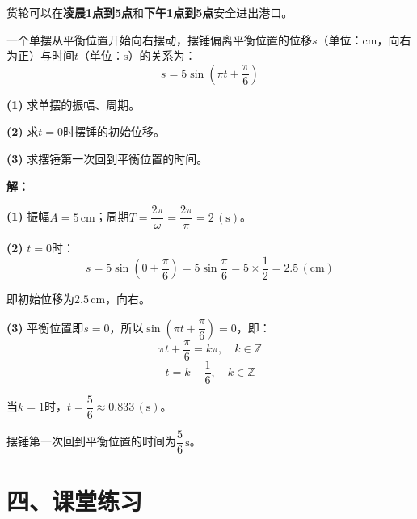 \documentclass[12pt, a4paper]{ctexart}
\begin{document}
货轮可以在\textbf{凌晨1点到5点}和\textbf{下午1点到5点}安全进出港口。

\begin{appbox}[【应用3】单摆与三角函数]
一个单摆从平衡位置开始向右摆动，摆锤偏离平衡位置的位移$s$（单位：$\text{cm}$，向右为正）与时间$t$（单位：$\text{s}$）的关系为：
\[
  s=5\sin\!\left(\pi t+\frac{\pi}{6}\right)
\]

\textbf{(1)} 求单摆的振幅、周期。

\textbf{(2)} 求$t=0$时摆锤的初始位移。

\textbf{(3)} 求摆锤第一次回到平衡位置的时间。
\end{appbox}

\textbf{解：}

\textbf{(1)} 振幅$A=5\,\text{cm}$；周期$T=\dfrac{2\pi}{\omega}=\dfrac{2\pi}{\pi}=2\,(\text{s})$。

\textbf{(2)} $t=0$时：
\[
  s=5\sin\!\left(0+\frac{\pi}{6}\right)=5\sin\frac{\pi}{6}=5\times\frac{1}{2}=2.5\,(\text{cm})
\]

即初始位移为$2.5\,\text{cm}$，向右。

\textbf{(3)} 平衡位置即$s=0$，所以$\sin\!\left(\pi t+\dfrac{\pi}{6}\right)=0$，即：
\[
  \pi t+\frac{\pi}{6}=k\pi,\quad k\in\mathbb{Z}
\]
\[
  t=k-\frac{1}{6},\quad k\in\mathbb{Z}
\]

当$k=1$时，$t=\dfrac{5}{6}\approx0.833\,(\text{s})$。

摆锤第一次回到平衡位置的时间为$\dfrac{5}{6}\,\text{s}$。

\newpage
\section*{\textcolor{tipgreen}{四、课堂练习}}
\end{document}

